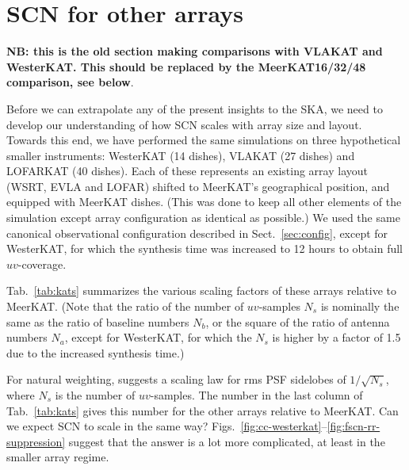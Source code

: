 \documentclass{aa}
\begin{document}
\section{SCN for other arrays}
\label{sec:other-arrays}

{\bf NB: this is the old section making comparisons with VLAKAT and WesterKAT. This should be replaced by the MeerKAT16/32/48 comparison, see below}.

Before we can extrapolate any of the present insights to the SKA, we need to develop our understanding of how SCN scales with array size and layout. Towards this end, we have performed the same simulations on three hypothetical smaller instruments: WesterKAT (14 dishes), VLAKAT (27 dishes) and LOFARKAT (40 dishes). Each of these represents an existing array layout (WSRT, EVLA and LOFAR) shifted to MeerKAT's geographical position, and equipped with MeerKAT dishes. (This was done to keep all other elements of the simulation except array configuration as identical as possible.) We used the same canonical observational configuration described in Sect.~\ref{sec:config}, except for WesterKAT, for which the synthesis time was increased to 12 hours to obtain full $uv$-coverage. 

Tab.~\ref{tab:kats} summarizes the various scaling factors of these arrays relative to MeerKAT. (Note that the ratio of the number of $uv$-samples $N_s$ is nominally the same as the ratio of baseline numbers $N_b$, or the square of the ratio of antenna numbers $N_a$, except for WesterKAT, for which the $N_s$ is higher by a factor of 1.5 due to the increased synthesis time.) 

For natural weighting, \citet{SKA49} suggests a scaling law for rms PSF sidelobes of $1/\sqrt{N_s}$, where $N_s$ is the number of $uv$-samples. The number in the last column of Tab.~\ref{tab:kats} gives this number for the other arrays relative to MeerKAT. Can we expect SCN to scale in the same way? Figs.~\ref{fig:cc-westerkat}--\ref{fig:fscn-rr-suppression} suggest that the answer is a lot more complicated, at least in the smaller array regime. 
\end{document}
